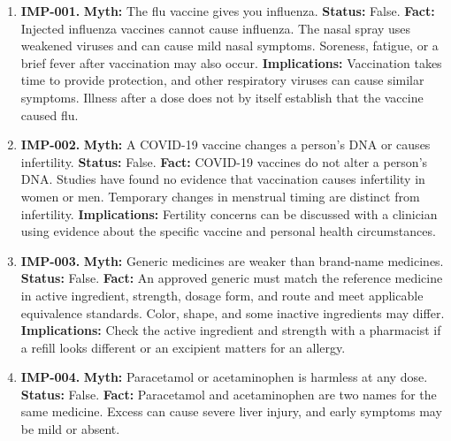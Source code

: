 \documentclass[11pt,oneside]{book}
\begin{document}
\begin{enumerate}[leftmargin=0pt,labelwidth=0pt,labelsep=0pt,itemindent=0pt]
The following high-impact myths are included because they can lead to preventable medication errors, delayed care, or avoidable harm.
\item[] \textbf{IMP-001.} \textbf{Myth:} The flu vaccine gives you influenza.\newline
\textbf{Status:} False.\newline
\textbf{Fact:} Injected influenza vaccines cannot cause influenza. The nasal spray uses weakened viruses and can cause mild nasal symptoms. Soreness, fatigue, or a brief fever after vaccination may also occur. \cite{ref40,ref396}\newline
\textbf{Implications:} Vaccination takes time to provide protection, and other respiratory viruses can cause similar symptoms. Illness after a dose does not by itself establish that the vaccine caused flu.
\item[] \textbf{IMP-002.} \textbf{Myth:} A COVID-19 vaccine changes a person's DNA or causes infertility.\newline
\textbf{Status:} False.\newline
\textbf{Fact:} COVID-19 vaccines do not alter a person's DNA. Studies have found no evidence that vaccination causes infertility in women or men. Temporary changes in menstrual timing are distinct from infertility. \cite{ref41}\newline
\textbf{Implications:} Fertility concerns can be discussed with a clinician using evidence about the specific vaccine and personal health circumstances.
\item[] \textbf{IMP-003.} \textbf{Myth:} Generic medicines are weaker than brand-name medicines.\newline
\textbf{Status:} False.\newline
\textbf{Fact:} An approved generic must match the reference medicine in active ingredient, strength, dosage form, and route and meet applicable equivalence standards. Color, shape, and some inactive ingredients may differ. \cite{ref42}\newline
\textbf{Implications:} Check the active ingredient and strength with a pharmacist if a refill looks different or an excipient matters for an allergy.
\item[] \textbf{IMP-004.} \textbf{Myth:} Paracetamol or acetaminophen is harmless at any dose.\newline
\textbf{Status:} False.\newline
\textbf{Fact:} Paracetamol and acetaminophen are two names for the same medicine. Excess can cause severe liver injury, and early symptoms may be mild or absent. \cite{ref43}\newline

\end{enumerate}
\end{document}
